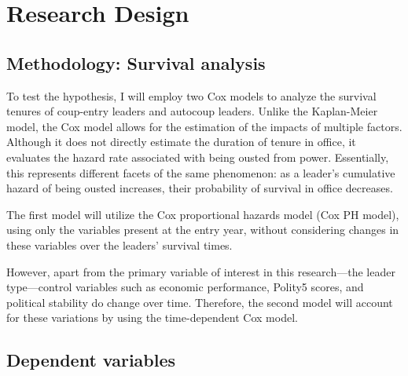 \documentclass[
  12pt,
]{report}
\begin{document}
\section{Research Design}\label{research-design-1}

\subsection{Methodology: Survival
analysis}\label{methodology-survival-analysis}

To test the hypothesis, I will employ two Cox models to analyze the
survival tenures of coup-entry leaders and autocoup leaders. Unlike the
Kaplan-Meier model, the Cox model allows for the estimation of the
impacts of multiple factors. Although it does not directly estimate the
duration of tenure in office, it evaluates the hazard rate associated
with being ousted from power. Essentially, this represents different
facets of the same phenomenon: as a leader's cumulative hazard of being
ousted increases, their probability of survival in office decreases.

The first model will utilize the Cox proportional hazards model (Cox PH
model), using only the variables present at the entry year, without
considering changes in these variables over the leaders' survival times.

However, apart from the primary variable of interest in this
research---the leader type---control variables such as economic
performance, Polity5 scores, and political stability do change over
time. Therefore, the second model will account for these variations by
using the time-dependent Cox model.

\subsection{Dependent variables}\label{dependent-variables}
\end{document}
